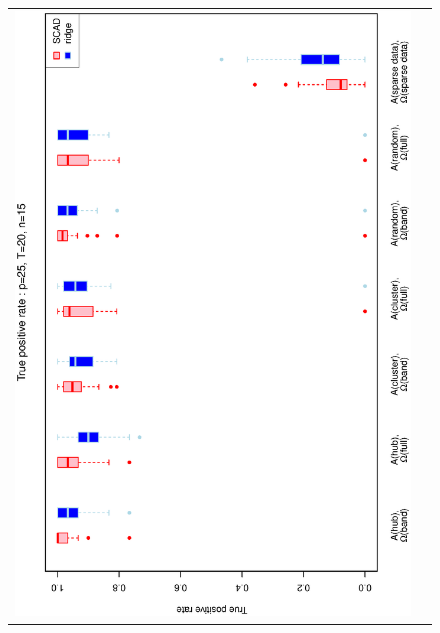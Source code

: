\documentclass[a4paper]{article}
\begin{document}
\begin{figure}[h!]
\centering
\begin{tabular}{cc}
\includegraphics[scale=0.5,angle=270]{ROCtpr25T20N15a.eps}\\

\end{tabular}
\end{figure}
\end{document}

